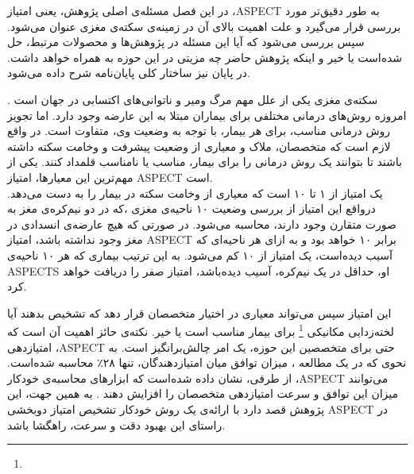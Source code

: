 

در این فصل مسئله‌ی اصلی پژوهش، یعنی امتیاز ،ASPECT به طور دقیق‌تر مورد بررسی قرار می‌گیرد و علت اهمیت بالای آن در زمینه‌ی سکته‌ی مغزی عنوان می‌شود.
سپس بررسی می‌شود که آیا این مسئله در پژوهش‌ها و محصولات مرتبط، حل شده‌است یا خیر و اینکه پژوهش حاضر چه مزیتی در این حوزه به همراه خواهد داشت.
در پایان نیز ساختار کلی پایان‌نامه شرح داده می‌شود.


سکته‌ی مغزی یکی از علل مهم مرگ ومیر و ناتوانی‌های اکتسابی در جهان است \cite{donkor2018stroke}.
امروزه روش‌های درمانی مختلفی برای بیماران مبتلا به این عارضه وجود دارد.
اما تجویز روش درمانی مناسب، برای هر بیمار، با توجه به وضعیت وی، متفاوت است.
در واقع لازم است که متخصصان، ملاک و معیاری از وضعیت پیشرفت و وخامت سکته داشته باشند تا بتوانند یک روش درمانی را برای بیمار، مناسب یا نامناسب قلمداد کنند.
یکی از مهم‌ترین این معیارها، امتیاز ASPECT است.\\

 یک امتیاز از ۱ تا ۱۰ است که معیاری از وخامت سکته در بیمار را به دست می‌دهد.
درواقع این امتیاز از بررسی وضعیت ۱۰ ناحیه‌ی مغزی ،که در دو نیم‌کره‌ی مغز به صورت متقارن وجود دارند، محاسبه می‌شود.
در صورتی که هیچ عارضه‌ی انسدادی در مغز وجود نداشته باشد، امتیاز ASPECT برابر ۱۰ خواهد بود و به ازای هر ناحیه‌ای که آسیب دیده‌است، یک امتیاز از ۱۰ کم می‌شود.
به این ترتیب بیماری که هر ۱۰ ناحیه‌ی ASPECTS او، حداقل در یک نیم‌کره، آسیب دیده‌باشد، امتیاز صفر را دریافت خواهد کرد.

این امتیاز سپس می‌تواند معیاری در اختیار متخصصان قرار دهد که تشخیص بدهند آیا لخته‌زدایی مکانیکی
\footnote{}
برای بیمار مناسب است یا خیر.
نکته‌ی حائز اهمیت آن است که امتیازدهی ،ASPECT حتی برای متخصصین این حوزه، یک امر چالش‌بر‌انگیز است.
به نحوی که در یک مطالعه \cite{van2021aspects}،
میزان توافق میان امتیازدهندگان، تنها ۲۸٪ محاسبه شده‌است.
از طرفی، نشان داده شده‌است که ابزار‌های محاسبه‌ی خودکار ،ASPECT می‌توانند
میزان این توافق و سرعت امتیازدهی متخصصان را افزایش دهند \cite{chen2022improving}.
به همین جهت، این پژوهش قصد دارد با ارائه‌ی یک روش خودکار تشخیص امتیاز دوبخشی ASPECT 
در راستای این بهبود دقت و سرعت، راهگشا باشد.

